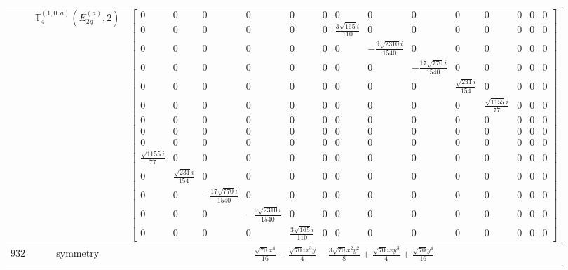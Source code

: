 \documentclass[fleqn,8pt,landscape]{jsarticle}
\begin{document}
\begin{longtable}{ccc}
$  $ & $ \mathbb{T}_{4}^{(1,0;a)}(E_{2g}^{(a)},2) $ & $ \begin{bmatrix} 0 & 0 & 0 & 0 & 0 & 0 & 0 & 0 & 0 & 0 & 0 & 0 & 0 & 0 \\ 0 & 0 & 0 & 0 & 0 & 0 & \frac{3 \sqrt{165} i}{110} & 0 & 0 & 0 & 0 & 0 & 0 & 0 \\ 0 & 0 & 0 & 0 & 0 & 0 & 0 & - \frac{9 \sqrt{2310} i}{1540} & 0 & 0 & 0 & 0 & 0 & 0 \\ 0 & 0 & 0 & 0 & 0 & 0 & 0 & 0 & - \frac{17 \sqrt{770} i}{1540} & 0 & 0 & 0 & 0 & 0 \\ 0 & 0 & 0 & 0 & 0 & 0 & 0 & 0 & 0 & \frac{\sqrt{231} i}{154} & 0 & 0 & 0 & 0 \\ 0 & 0 & 0 & 0 & 0 & 0 & 0 & 0 & 0 & 0 & \frac{\sqrt{1155} i}{77} & 0 & 0 & 0 \\ 0 & 0 & 0 & 0 & 0 & 0 & 0 & 0 & 0 & 0 & 0 & 0 & 0 & 0 \\ 0 & 0 & 0 & 0 & 0 & 0 & 0 & 0 & 0 & 0 & 0 & 0 & 0 & 0 \\ 0 & 0 & 0 & 0 & 0 & 0 & 0 & 0 & 0 & 0 & 0 & 0 & 0 & 0 \\ \frac{\sqrt{1155} i}{77} & 0 & 0 & 0 & 0 & 0 & 0 & 0 & 0 & 0 & 0 & 0 & 0 & 0 \\ 0 & \frac{\sqrt{231} i}{154} & 0 & 0 & 0 & 0 & 0 & 0 & 0 & 0 & 0 & 0 & 0 & 0 \\ 0 & 0 & - \frac{17 \sqrt{770} i}{1540} & 0 & 0 & 0 & 0 & 0 & 0 & 0 & 0 & 0 & 0 & 0 \\ 0 & 0 & 0 & - \frac{9 \sqrt{2310} i}{1540} & 0 & 0 & 0 & 0 & 0 & 0 & 0 & 0 & 0 & 0 \\ 0 & 0 & 0 & 0 & \frac{3 \sqrt{165} i}{110} & 0 & 0 & 0 & 0 & 0 & 0 & 0 & 0 & 0 \end{bmatrix} $ \\ \hline
$ 932 $ & $ \text{symmetry} $ & $ \frac{\sqrt{70} x^{4}}{16} - \frac{\sqrt{70} i x^{3} y}{4} - \frac{3 \sqrt{70} x^{2} y^{2}}{8} + \frac{\sqrt{70} i x y^{3}}{4} + \frac{\sqrt{70} y^{4}}{16} $ \\

\end{longtable}
\end{document}
